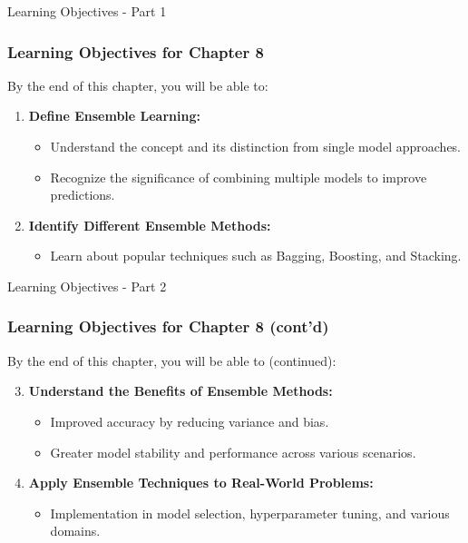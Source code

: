 \documentclass[aspectratio=169]{beamer}
\begin{document}
\begin{frame}[fragile]{Learning Objectives - Part 1}
    \frametitle{Learning Objectives for Chapter 8}
    By the end of this chapter, you will be able to:
    \begin{enumerate}
        \item \textbf{Define Ensemble Learning:}
        \begin{itemize}
            \item Understand the concept and its distinction from single model approaches.
            \item Recognize the significance of combining multiple models to improve predictions.
        \end{itemize}
        
        \item \textbf{Identify Different Ensemble Methods:}
        \begin{itemize}
            \item Learn about popular techniques such as Bagging, Boosting, and Stacking.
        \end{itemize}
    \end{enumerate}
\end{frame}

\begin{frame}[fragile]{Learning Objectives - Part 2}
    \frametitle{Learning Objectives for Chapter 8 (cont'd)}
    By the end of this chapter, you will be able to (continued):
    \begin{enumerate}
        \setcounter{enumi}{2}
        \item \textbf{Understand the Benefits of Ensemble Methods:}
        \begin{itemize}
            \item Improved accuracy by reducing variance and bias.
            \item Greater model stability and performance across various scenarios.
        \end{itemize}
        
        \item \textbf{Apply Ensemble Techniques to Real-World Problems:}
        \begin{itemize}
            \item Implementation in model selection, hyperparameter tuning, and various domains.
        \end{itemize}
    \end{enumerate}
\end{frame}
\end{document}
